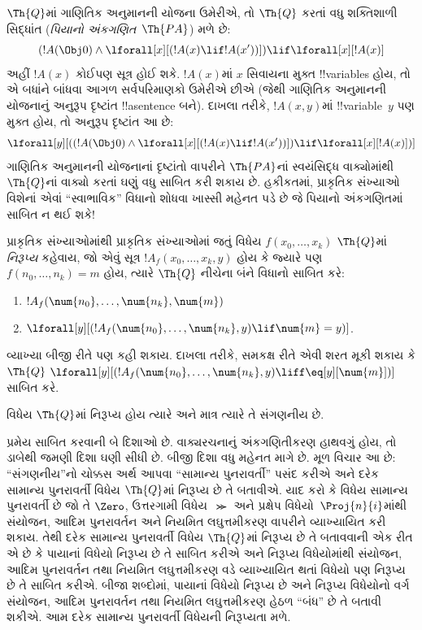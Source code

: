 \documentclass[../../../include/open-logic-section]{subfiles}
\begin{document}
$\Th{Q}$માં ગાણિતિક અનુમાનની યોજના ઉમેરીએ,
તો $\Th{Q}$ કરતાં વધુ શક્તિશાળી સિદ્ધાંત
(\emph{પિયાનો અંકગણિત}~$\Th{PA}$)
મળે છે:
\[
(!A(\Obj 0) \land \lforall[x][(!A(x) \lif !A(x'))]) \lif \lforall[x][!A(x)]
\]
અહીં $!A(x)$ કોઈપણ સૂત્ર હોઈ શકે.
$!A(x)$માં $x$ સિવાયના મુક્ત
!!{variable}s હોય, તો એ બધાંને બાંધવા
આગળ સર્વપરિમાણકો ઉમેરીએ છીએ
(જેથી ગાણિતિક અનુમાનની યોજનાનું અનુરૂપ દૃષ્ટાંત
!!a{sentence} બને). દાખલા તરીકે,
$!A(x, y)$માં !!{variable}~$y$
પણ મુક્ત હોય, તો અનુરૂપ દૃષ્ટાંત આ છે:
\[
\lforall[y][((!A(\Obj 0) \land \lforall[x][(!A(x) \lif !A(x'))]) \lif
  \lforall[x][!A(x)])]
\]
ગાણિતિક અનુમાનની યોજનાનાં દૃષ્ટાંતો વાપરીને
$\Th{PA}$નાં સ્વયંસિદ્ધ વાક્યોમાંથી
$\Th{Q}$નાં વાક્યો કરતાં ઘણું વધુ
સાબિત કરી શકાય છે. હકીકતમાં,
પ્રાકૃતિક સંખ્યાઓ વિશેનાં એવાં
``સ્વાભાવિક'' વિધાનો શોધવા ખાસ્સી
મહેનત પડે છે જે પિયાનો અંકગણિતમાં
સાબિત ન થઈ શકે!{}

\begin{defn}
  પ્રાકૃતિક સંખ્યાઓમાંથી પ્રાકૃતિક
  સંખ્યાઓમાં જતું વિધેય
  $f(x_0,\ldots,x_k)$
  {$\Th{Q}$માં \emph{નિરૂપ્ય}}
  કહેવાય, જો એવું સૂત્ર
  $!A_f(x_0,\dots,x_k,y)$ હોય કે
  જ્યારે પણ $f(n_0,\dots,n_k) = m$
  હોય, ત્યારે $\Th{Q}$ નીચેના
  બંને વિધાનો સાબિત કરે:
\begin{enumerate}
\item{} $!A_f(\num{n_0}, \dots, \num{n_k}, \num{m})$
\item{} $\lforall[y][(!A_f(\num{n_0}, \dots,
\num{n_k}, y) \lif \num{m} = y)]$.
\end{enumerate}
\end{defn}

વ્યાખ્યા બીજી રીતે પણ કહી શકાય.
દાખલા તરીકે, સમકક્ષ રીતે એવી
શરત મૂકી શકાય કે $\Th{Q}$
$\lforall[y][(!A_f(\num{n_0}, \dots,
\num{n_k}, y) \liff \eq[y][\num{m}])]$
સાબિત કરે.

\begin{thm}
વિધેય $\Th{Q}$માં નિરૂપ્ય હોય ત્યારે
અને માત્ર ત્યારે તે સંગણનીય છે.
\end{thm}

પ્રમેય સાબિત કરવાની બે દિશાઓ છે.
વાક્યરચનાનું અંકગણિતીકરણ હાથવગું
હોય, તો ડાબેથી જમણી દિશા ઘણી
સીધી છે. બીજી દિશા વધુ મહેનત માગે
છે. મૂળ વિચાર આ છે: ``સંગણનીય''નો
ચોક્કસ અર્થ આપવા ``સામાન્ય
પુનરાવર્તી'' પસંદ કરીએ અને દરેક
સામાન્ય પુનરાવર્તી વિધેય
$\Th{Q}$માં નિરૂપ્ય છે તે બતાવીએ.
યાદ કરો કે વિધેય સામાન્ય પુનરાવર્તી
છે જો તે $\Zero$, ઉત્તરગામી
વિધેય~$\Succ$ અને પ્રક્ષેપ
વિધેયો~$\Proj{n}{i}$માંથી સંયોજન,
આદિમ પુનરાવર્તન અને નિયમિત
લઘુત્તમીકરણ વાપરીને વ્યાખ્યાયિત
કરી શકાય. તેથી દરેક સામાન્ય
પુનરાવર્તી વિધેય $\Th{Q}$માં
નિરૂપ્ય છે તે બતાવવાની એક રીત
એ છે કે પાયાનાં વિધેયો નિરૂપ્ય છે
તે સાબિત કરીએ અને નિરૂપ્ય
વિધેયોમાંથી સંયોજન, આદિમ
પુનરાવર્તન તથા નિયમિત
લઘુત્તમીકરણ વડે વ્યાખ્યાયિત
થતાં વિધેયો પણ નિરૂપ્ય છે તે
સાબિત કરીએ. બીજા શબ્દોમાં,
પાયાનાં વિધેયો નિરૂપ્ય છે અને
નિરૂપ્ય વિધેયોનો વર્ગ સંયોજન,
આદિમ પુનરાવર્તન તથા નિયમિત
લઘુત્તમીકરણ હેઠળ ``બંધ'' છે
તે બતાવી શકીએ. આમ દરેક સામાન્ય
પુનરાવર્તી વિધેયની નિરૂપ્યતા મળે.
\end{document}
